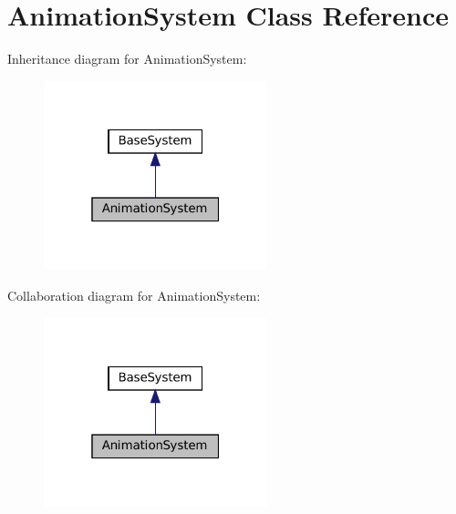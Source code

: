 \hypertarget{classAnimationSystem}{}\section{Animation\+System Class Reference}
\label{classAnimationSystem}


Inheritance diagram for Animation\+System\+:
\nopagebreak
\begin{figure}[H]
\begin{center}
\leavevmode
\includegraphics[width=184pt]{classAnimationSystem__inherit__graph}
\end{center}
\end{figure}


Collaboration diagram for Animation\+System\+:
\nopagebreak
\begin{figure}[H]
\begin{center}
\leavevmode
\includegraphics[width=184pt]{classAnimationSystem__coll__graph}
\end{center}
\end{figure}
